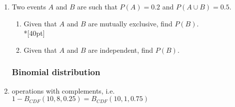 \documentclass[12pt, oneside]{article}
\begin{document}
\begin{enumerate}
\begin{enumerate}
\end{enumerate}

\item Two events $A$ and $B$ are such that $P(A)=0.2$ and $P(A \cup B) =0.5$. 
\begin{enumerate}
    \item Given that $A$ and $B$ are mutually exclusive, find $P(B)$.\\*[40pt]
    \item Given that $A$ and $B$ are independent, find $P(B)$.
\end{enumerate}

\newpage
\subsubsection*{Binomial distribution}
\item operations with complements, i.e. $1-B_{CDF}(10,8,0.25)=B_{CDF}(10,1,0.75)$


\end{enumerate}
\end{document}
